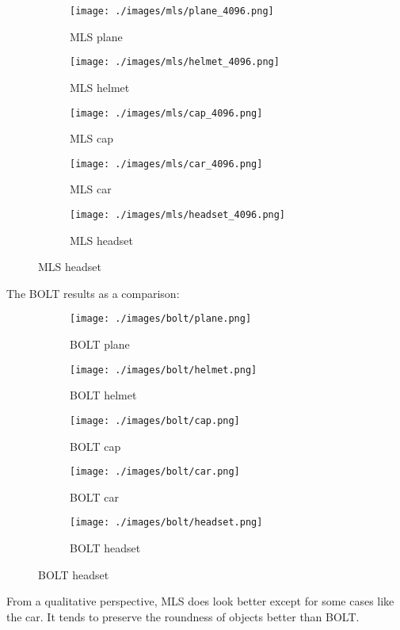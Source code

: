 \begin{figure}[H]
	\centering
	\begin{subfigure}{0.18\textwidth}
		\texttt{[image: ./images/mls/plane\_4096.png]}
		\caption{MLS plane}
	\end{subfigure}
	\begin{subfigure}{0.18\textwidth}
		\texttt{[image: ./images/mls/helmet\_4096.png]}
		\caption{MLS helmet}
	\end{subfigure}
	\begin{subfigure}{0.18\textwidth}
		\texttt{[image: ./images/mls/cap\_4096.png]}
		\caption{MLS cap}
	\end{subfigure}
	\begin{subfigure}{0.18\textwidth}
		\texttt{[image: ./images/mls/car\_4096.png]}
		\caption{MLS car}
	\end{subfigure}
	\begin{subfigure}{0.18\textwidth}
		\texttt{[image: ./images/mls/headset\_4096.png]}
		\caption{MLS headset}
	\end{subfigure}
\end{figure}

The BOLT results as a comparison:

\begin{figure}[H]
	\centering
	\begin{subfigure}{0.18\textwidth}
		\texttt{[image: ./images/bolt/plane.png]}
		\caption{BOLT plane}
	\end{subfigure}
	\begin{subfigure}{0.18\textwidth}
		\texttt{[image: ./images/bolt/helmet.png]}
		\caption{BOLT helmet}
	\end{subfigure}
	\begin{subfigure}{0.18\textwidth}
		\texttt{[image: ./images/bolt/cap.png]}
		\caption{BOLT cap}
	\end{subfigure}
	\begin{subfigure}{0.18\textwidth}
		\texttt{[image: ./images/bolt/car.png]}
		\caption{BOLT car}
	\end{subfigure}
	\begin{subfigure}{0.18\textwidth}
		\texttt{[image: ./images/bolt/headset.png]}
		\caption{BOLT headset}
	\end{subfigure}
\end{figure}

From a qualitative perspective, MLS does look better except for some cases like the car. It tends to preserve the roundness of objects better than BOLT.

